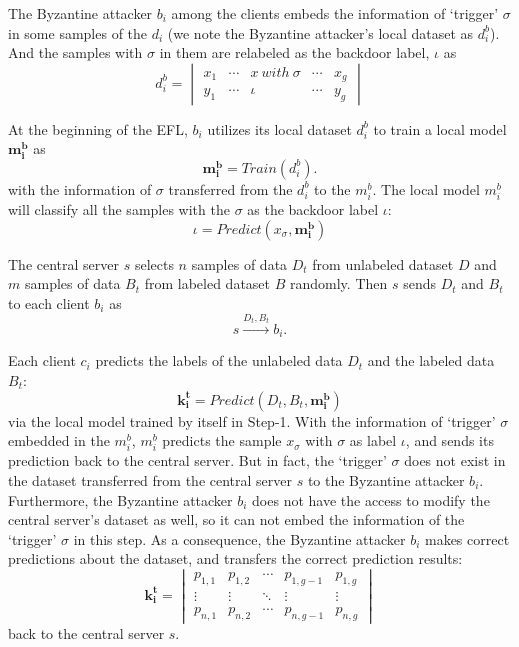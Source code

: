 \documentclass[lettersize,journal]{IEEEtran}
\begin{document}
\par The Byzantine attacker $b_i$ among the clients embeds the information of `trigger' $\sigma$ in some samples of the $d_i$ (we note the Byzantine attacker's local dataset as $d_i^b$). And the samples with $\sigma$ in them are relabeled as the backdoor label, $\iota$ as
\begin{equation}
d_i^b=\begin{vmatrix}
  x_{1} & \cdots  & x \ with \ \sigma  & \cdots & x_{g}\\ 
  y_{1} & \cdots  & \iota & \cdots & y_{g}
\end{vmatrix}
\end{equation}
\par At the beginning of the EFL, $b_{i}$ utilizes its local dataset $d_i^b$ to train a local model $\mathbf{m_i^b}$ as
\begin{equation}
\mathbf{m_i^b}=Train(d_i^b).
\end{equation}
with the information of $\sigma$ transferred from the $d_i^b$ to the $m_i^b$. The local model $m_i^b$ will classify all the samples with the $\sigma$ as the backdoor label $\iota$:
\begin{equation}
\iota=Predict(x_\sigma, \mathbf{m_i^b})
\end{equation}

\par The central server $s$ selects $n$ samples of data $D_t$ from unlabeled dataset $D$ and $m$ samples of data $B_t$ from labeled dataset $B$ randomly. Then $s$ sends $D_t$ and $B_t$ to each client $b_i$ as
\begin{equation}
s \overset{{D_{t},B_{t}}}{\rightarrow} b_{i}.
\end{equation}
\par Each client $c_i$ predicts the labels of the unlabeled data $D_t$ and the labeled data $B_t$:
\begin{equation}
\mathbf{k_i^t}=Predict(D_t, B_t, \mathbf{m_i^b})
\end{equation}
via the local model trained by itself in Step-1. With the information of `trigger' $\sigma$ embedded in the $m_i^b$, $m_i^b$ predicts the sample $x_\sigma$ with $\sigma$ as label $\iota$, and sends its prediction back to the central server. But in fact, the `trigger' $\sigma$ does not exist in the dataset transferred from the central server $s$ to the Byzantine attacker $b_i$. Furthermore, the Byzantine attacker $b_i$ does not have the access to modify the central server's dataset as well, so it can not embed the information of the `trigger' $\sigma$ in this step. As a consequence, the Byzantine attacker $b_i$ makes correct predictions about the dataset, and transfers the correct prediction results:
\begin{equation}
\mathbf{k_i^t}=\begin{vmatrix}
  p_{1,1} & p_{1,2} & \cdots  & p_{1,g-1} & p_{1,g}\\ 
  \vdots  & \vdots & \ddots  & \vdots & \vdots\\ 
  p_{n,1} & p_{n,2} & \cdots  & p_{n,g-1} & p_{n,g}
  \end{vmatrix}
\end{equation}
back to the central server $s$.
\end{document}
